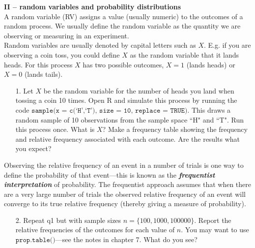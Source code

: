 \documentclass[10pt]{extarticle}
\newcommand{\bfit}[1]{\textbf{\textit{#1}}}
\begin{document}
\newpage

{\bf \Large II -- random variables and probability distributions} \\ 

A random variable (RV) assigns a value (usually numeric) to the outcomes of a random process. We usually define the random variable as the quantity we are observing or measuring in an experiment. \\

Random variables are usually denoted by capital letters such as $X$. E.g. if you are observing a coin toss, you could define $X$ as the random variable that it lands heads. For this process $X$ has two possible outcomes, $X=1$ (lands heads) or $X=0$ (lands tails). 

\hfill

\begin{itemize}

	\item[1.] Let $X$ be the random variable for the number of heads you land when tossing a coin 10 times. Open R and simulate this process by running the code $\texttt{sample(x = c(`H',`T'), size = 10, replace = TRUE)}$. This draws a random sample of 10 observations from the sample space ``H" and ``T". Run this process once. What is $X$? Make a frequency table showing the frequency and relative frequency associated with each outcome. Are the results what you expect?  

\end{itemize}

\hfill 

Observing the relative frequency of an event in a number of trials is one way to define the probability of that event---this is known as the {\bfit{frequentist interpretation}} of probability. The frequentist approach assumes that when there are a very large number of trials the observed relative frequency of an event will converge to its true relative frequency (thereby giving a measure of probability). 

\hfill 

\begin{itemize}

	\item[2.] Repeat q1 but with sample sizes $n = \{100, 1000, 100000\}$. Report the relative frequencies of the outcomes for each value of $n$. You may want to use $\texttt{prop.table()}$---see the notes in chapter 7. What do you see?  

\end{itemize}
\end{document}
